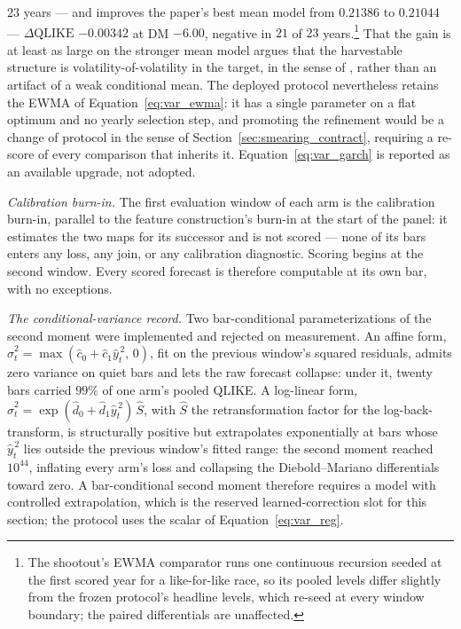 $23$ years --- and improves the paper's best mean model from
$0.21386$ to $0.21044$ --- $\Delta\mathrm{QLIKE}$ $-0.00342$ at DM
$-6.00$, negative in $21$ of $23$ years.\footnote{The shootout's EWMA
comparator runs one continuous recursion seeded at the first scored
year for a like-for-like race, so its pooled levels differ slightly
from the frozen protocol's headline levels, which re-seed at every
window boundary; the paired differentials are unaffected.} That the
gain is at least as large on the stronger mean model argues that the
harvestable structure is volatility-of-volatility in the target, in
the sense of \citet{CorsiMittnikPigorschPigorsch2008}, rather than an
artifact of a weak conditional mean. The deployed protocol
nevertheless retains the EWMA of Equation~\eqref{eq:var_ewma}: it has
a single parameter on a flat optimum and no yearly selection step, and
promoting the refinement would be a change of protocol in the sense of
Section~\ref{sec:smearing_contract}, requiring a re-score of every
comparison that inherits it. Equation~\eqref{eq:var_garch} is reported
as an available upgrade, not adopted.

\emph{Calibration burn-in.} The first evaluation window of each arm is
the calibration burn-in, parallel to the feature construction's burn-in
at the start of the panel: it estimates the two maps for its successor
and is not scored --- none of its bars enters any loss, any join, or any
calibration diagnostic. Scoring begins at the second window. Every
scored forecast is therefore computable at its own bar, with no
exceptions.

\emph{The conditional-variance record.} Two bar-conditional
parameterizations of the second moment were implemented and rejected on
measurement. An affine form,
$\hat{\sigma}^2_t = \max(\hat{c}_0 + \hat{c}_1 \hat{y}_t^{\,2},\, 0)$,
fit on the previous window's squared residuals, admits zero variance on
quiet bars and lets the raw forecast collapse: under it, twenty bars
carried $99\%$ of one arm's pooled QLIKE. A log-linear form,
$\hat{\sigma}^2_t
= \exp(\hat{d}_0 + \hat{d}_1 \hat{y}_t^{\,2})\,\hat{S}$, with $\hat{S}$
the \citet{Duan1983} retransformation factor for the log-back-transform, is
structurally positive but extrapolates exponentially at bars whose
$\hat{y}_t^{\,2}$ lies outside the previous window's fitted range: the
second moment reached $10^{44}$, inflating every arm's loss and
collapsing the Diebold--Mariano differentials toward zero. A
bar-conditional second moment therefore requires a model with controlled
extrapolation, which is the reserved learned-correction slot for this
section; the protocol uses the scalar of Equation~\eqref{eq:var_reg}.

